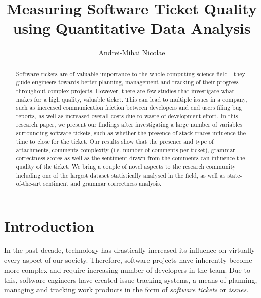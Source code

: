 \documentclass{mpaper}
\begin{document}
\title{Measuring Software Ticket Quality using Quantitative Data Analysis}
\author{Andrei-Mihai Nicolae}

\maketitle

\begin{abstract}
Software tickets are of valuable importance to the whole computing science 
field - they guide engineers towards better planning, management 
and tracking of their progress throughout complex projects. However, there
are few studies that investigate what makes for a high quality,
valuable ticket. This can lead to multiple issues in a company, such as 
increased communication friction between developers and end users filing bug
reports, as well as increased overall costs due to waste of development effort. 
In this research paper, we present our findings after 
investigating a large number of variables surrounding software tickets, 
such as whether the presence of stack traces influence the time 
to close for the ticket. Our results show that the presence and type of attachments,
comments complexity (i.e. number of comments per ticket), grammar correctness scores
as well as the sentiment drawn from the comments can influence the quality of the ticket.
We bring a couple of novel aspects to the research
community including one of the largest dataset statistically analysed in the field,
as well as state-of-the-art sentiment and grammar correctness analysis.
\end{abstract}

\section{Introduction}

In the past decade, technology has drastically increased its influence on 
virtually every aspect of our society. Therefore, software projects have 
inherently become more complex and require increasing number of developers in
the team. Due to this, software engineers have created issue tracking systems,
a means of planning, managing and tracking work products in the form of 
\emph{software tickets} or \emph{issues}.
\end{document}
